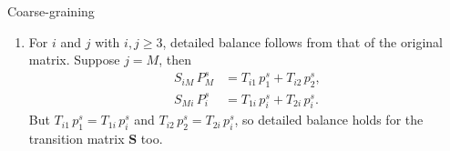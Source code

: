 \documentclass[12pt]{article}
\begin{document}
\begin{problem}{Coarse-graining}
\begin{enumerate}
  \item
    For $i$ and $j$ with $i, j \ge 3$,
    detailed balance follows from that of the original matrix.
    Suppose $j = M$, then
    $$
    \begin{aligned}
      S_{iM} \, P^s_M &= T_{i1} \, p^s_1 + T_{i2} \, p^s_2, \\
      S_{Mi} \, P^s_i &= T_{1i} \, p^s_i + T_{2i} \, p^s_i.
    \end{aligned}
    $$
    But $T_{i1} \, p^s_1 = T_{1i} \, p^s_i$ and
    $T_{i2} \, p^s_2 = T_{2i} \, p^s_i$,
    so detailed balance holds for the transition matrix $\mathbf S$ too.


\end{enumerate}
\end{problem}
\end{document}
